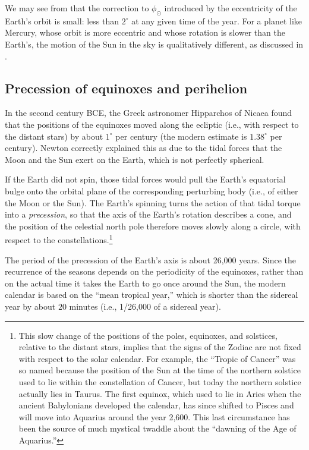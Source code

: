 We may see from  that the correction to $\phi_\odot$ introduced by the eccentricity of the Earth's orbit is small: less than $2^\circ$ at any given time of the year.  For a planet like Mercury, whose orbit is more eccentric and whose rotation is slower than the Earth's, the motion of the Sun in the sky is qualitatively different, as discussed in \citep{Mercury}.

\subsection{Precession of equinoxes and perihelion}

In the second century BCE, the Greek astronomer Hipparchos of Nicaea found that the positions of the equinoxes moved along the ecliptic (i.e., with respect to the distant stars) by about $1^\circ$ per century (the modern estimate is $1.38^\circ$ per century).  Newton correctly explained this as due to the tidal forces that the Moon and the Sun exert on the Earth, which is not perfectly spherical.  

If the Earth did not spin, those tidal forces would pull the Earth's equatorial bulge onto the orbital plane of the corresponding perturbing body (i.e., of either the Moon or the Sun).  The Earth's spinning turns the action of that tidal torque into a \emph{precession}, so that the axis of the Earth's rotation describes a cone, and the position of the celestial north pole therefore moves slowly along a circle, with respect to the constellations.\footnote{This slow change of the positions of the poles, equinoxes, and solstices, relative to the distant stars, implies that the signs of the Zodiac are not fixed with respect to the solar calendar.  For example, the ``Tropic of Cancer'' was so named because the position of the Sun at the time of the northern solstice used to lie within the constellation of Cancer, but today the northern solstice actually lies in Taurus.  The first equinox, which used to lie in Aries when the ancient Babylonians developed the calendar, has since shifted to Pisces and will move into Aquarius around the year 2,600.  This last circumstance has been the source of much mystical twaddle about the ``dawning of the Age of Aquarius.''}

The period of the precession of the Earth's axis is about 26,000 years.  Since the recurrence of the seasons depends on the periodicity of the equinoxes, rather than on the actual time it takes the Earth to go once around the Sun, the modern calendar is based on the ``mean tropical year,'' which is shorter than the sidereal year by about $20$ minutes (i.e., 1/26,000 of a sidereal year).

